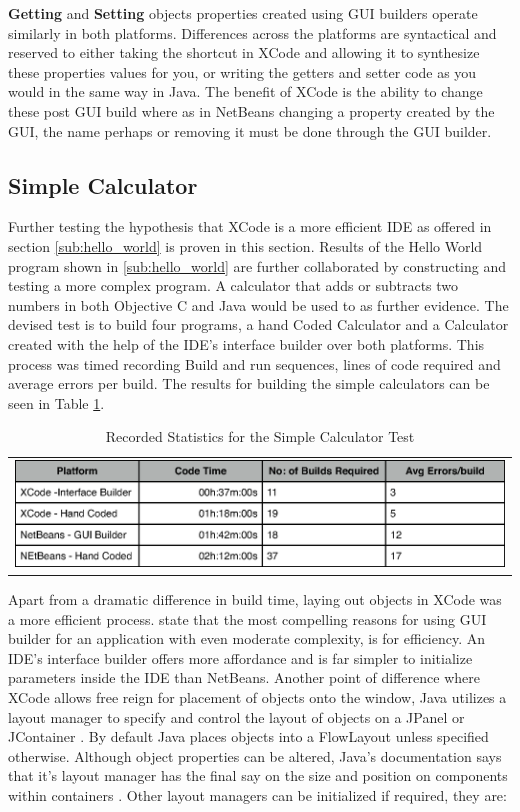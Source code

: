 \documentclass[a4paper,14pt]{article}
\begin{document}
\textbf{Getting} and \textbf{Setting} objects properties created using GUI builders operate similarly in both platforms. Differences across the platforms are syntactical and reserved to either taking the shortcut in XCode and allowing it to synthesize these properties values for you, or writing the getters and setter code as you would in the same way in Java. The benefit of XCode is the ability to change these post GUI build where as in NetBeans changing a property created by the GUI, the name perhaps or removing it must be done through the GUI builder.

\subsection{Simple Calculator} %
\label{sub:simple_calculator}
Further testing the hypothesis that XCode is a more efficient IDE as offered in section \ref{sub:hello_world} is proven in this section. Results of the Hello World program shown in \ref{sub:hello_world} are further collaborated by constructing and testing a more complex program. A calculator that adds or subtracts two numbers in both Objective C and Java would be used to as further evidence. The devised test is to build four programs, a hand Coded Calculator and a Calculator created with the help of the IDE's interface builder over both platforms. This process was timed recording Build and run sequences, lines of code required and average errors per build. The results for building the simple calculators can be seen in Table \ref{table:simplecalc}. 
\begin{table}[H]
\centering
\begin{tabular}{l}
\includegraphics[scale=0.65]{simplecalculator.eps}
\end{tabular}
\caption{Recorded Statistics for the Simple Calculator Test}
\label{table:simplecalc}
\end{table}
Apart from a dramatic difference in build time, laying out objects in XCode was a more efficient process.  state that the most compelling reasons for using GUI builder for an application with even moderate complexity, is for efficiency. An IDE's interface builder offers more affordance and is far simpler to initialize parameters inside the IDE than NetBeans. Another point of difference where XCode allows free reign for placement of objects onto the window, Java utilizes a layout manager to specify and control the layout of objects on a JPanel or JContainer \cite{nla.cat-vn3060178}. By default Java places objects into a FlowLayout unless specified otherwise. Although object properties can be altered, Java's documentation says that it's layout manager has the final say on the size and position on components within containers \cite{Oracle2011}. Other layout managers can be initialized if required, they are:
\end{document}
